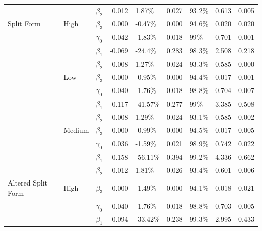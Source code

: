 \documentclass{svjour3}\usepackage[]{graphicx}\usepackage[]{color}
\newenvironment{knitrout}{}{} %
\begin{document}
\begin{knitrout}
\begin{table}[!h]
{\begin{tabular}[t]{l|l|l|r|l|r|l|r|r}
 &  & $\beta_2$ & 0.012 & 1.87\% & 0.027 & 93.2\% & 0.613 & 0.005\\

\multirow{-12}{*}{\raggedright\arraybackslash Split Form} & \multirow{-4}{*}{\raggedright\arraybackslash High} & $\beta_3$ & 0.000 & -0.47\% & 0.000 & 94.6\% & 0.020 & 0.020\\
\cline{1-9}
 &  & $\gamma_0$ & 0.042 & -1.83\% & 0.018 & 99\% & 0.701 & 0.001\\

 &  & $\beta_1$ & -0.069 & -24.4\% & 0.283 & 98.3\% & 2.508 & 0.218\\

 &  & $\beta_2$ & 0.008 & 1.27\% & 0.024 & 93.3\% & 0.585 & 0.000\\

 & \multirow{-4}{*}{\raggedright\arraybackslash Low} & $\beta_3$ & 0.000 & -0.95\% & 0.000 & 94.4\% & 0.017 & 0.001\\

 &  & $\gamma_0$ & 0.040 & -1.76\% & 0.018 & 98.8\% & 0.704 & 0.007\\

 &  & $\beta_1$ & -0.117 & -41.57\% & 0.277 & 99\% & 3.385 & 0.508\\

 &  & $\beta_2$ & 0.008 & 1.29\% & 0.024 & 93.1\% & 0.585 & 0.002\\

 & \multirow{-4}{*}{\raggedright\arraybackslash Medium} & $\beta_3$ & 0.000 & -0.99\% & 0.000 & 94.5\% & 0.017 & 0.005\\

 &  & $\gamma_0$ & 0.036 & -1.59\% & 0.021 & 98.9\% & 0.742 & 0.022\\

 &  & $\beta_1$ & -0.158 & -56.11\% & 0.394 & 99.2\% & 4.336 & 0.662\\

 &  & $\beta_2$ & 0.012 & 1.81\% & 0.026 & 93.4\% & 0.601 & 0.006\\

\multirow{-12}{*}{\raggedright\arraybackslash Altered Split Form} & \multirow{-4}{*}{\raggedright\arraybackslash High} & $\beta_3$ & 0.000 & -1.49\% & 0.000 & 94.1\% & 0.018 & 0.021\\
\cline{1-9}
 &  & $\gamma_0$ & 0.040 & -1.76\% & 0.018 & 98.8\% & 0.703 & 0.005\\

 &  & $\beta_1$ & -0.094 & -33.42\% & 0.238 & 99.3\% & 2.995 & 0.433\\


\end{tabular}}
\end{table}
\end{knitrout}
\end{document}
